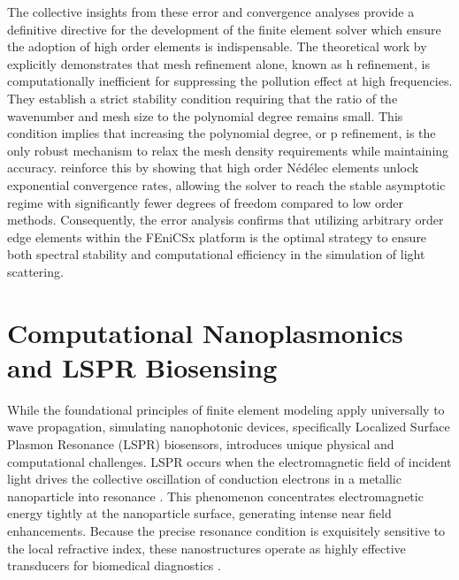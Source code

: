 \documentclass[class=report, crop=false]{standalone}
\begin{document}
\vspace{12pt}

The collective insights from these error and convergence analyses provide a definitive directive for the development of the finite element solver which ensure the adoption of high order elements is indispensable. The theoretical work by \citet{Melenk2024} explicitly demonstrates that mesh refinement alone, known as h refinement, is computationally inefficient for suppressing the pollution effect at high frequencies. They establish a strict stability condition requiring that the ratio of the wavenumber and mesh size to the polynomial degree remains small. This condition implies that increasing the polynomial degree, or p refinement, is the only robust mechanism to relax the mesh density requirements while maintaining accuracy. \citet{Nicaise2020} reinforce this by showing that high order Nédélec elements unlock exponential convergence rates, allowing the solver to reach the stable asymptotic regime with significantly fewer degrees of freedom compared to low order methods. Consequently, the error analysis confirms that utilizing arbitrary order edge elements within the FEniCSx platform is the optimal strategy to ensure both spectral stability and computational efficiency in the simulation of light scattering.

\section{Computational Nanoplasmonics and LSPR Biosensing}

While the foundational principles of finite element modeling apply universally to wave propagation, simulating nanophotonic devices, specifically Localized Surface Plasmon Resonance (LSPR) biosensors, introduces unique physical and computational challenges. LSPR occurs when the electromagnetic field of incident light drives the collective oscillation of conduction electrons in a metallic nanoparticle into resonance \citep{Mayer2011}. This phenomenon concentrates electromagnetic energy tightly at the nanoparticle surface, generating intense near field enhancements. Because the precise resonance condition is exquisitely sensitive to the local refractive index, these nanostructures operate as highly effective transducers for biomedical diagnostics \citep{Das2023}.

\vspace{12pt}
\end{document}
